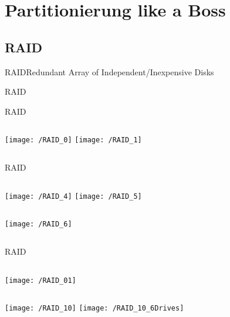 \documentclass[pdflatex, ngerman]{beamer}
\begin{document}
\section{Partitionierung like a Boss}

\subsection{RAID}

\begin{frame}{RAID}{Redundant Array of Independent/Inexpensive Disks}
\begin{block}{RAID}
\end{block}
\end{frame}

\begin{frame}{RAID}%
\begin{columns}
\centering\texttt{[image: /RAID\_0]}
\centering\texttt{[image: /RAID\_1]}
\end{columns}
\end{frame}

\begin{frame}{RAID}%
\begin{columns}
\centering\texttt{[image: /RAID\_4]}
\centering\texttt{[image: /RAID\_5]}
\end{columns}
\begin{columns}
\centering\texttt{[image: /RAID\_6]}
\end{columns}
\end{frame}

\begin{frame}{RAID}%

\begin{columns}
\centering\texttt{[image: /RAID\_01]}
\end{columns}
\begin{columns}
\centering\texttt{[image: /RAID\_10]}
\centering\texttt{[image: /RAID\_10\_6Drives]}
\end{columns}
\end{frame}
\end{document}
